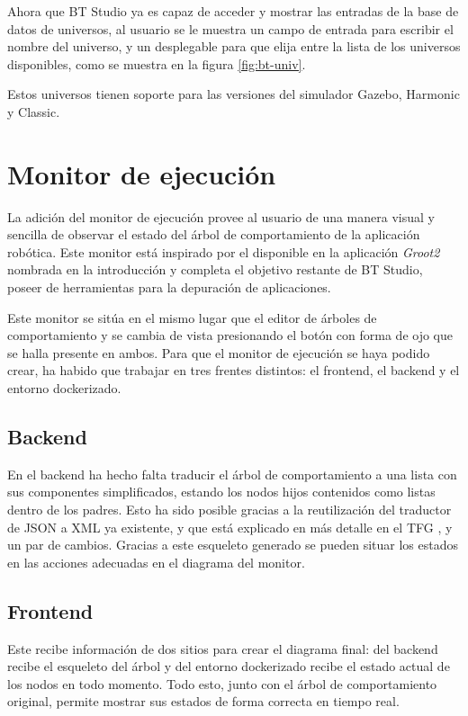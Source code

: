 Ahora que BT Studio ya es capaz de acceder y mostrar las entradas de la base de datos de universos, al usuario se le muestra un campo de entrada para escribir el nombre del universo, y un desplegable para que elija entre la lista de los universos disponibles, como se muestra en la figura \ref{fig:bt-univ}.

Estos universos tienen soporte para las versiones del simulador Gazebo, Harmonic y Classic.

\section{Monitor de ejecución}\label{sec:bt-monitor}

La adición del monitor de ejecución provee al usuario de una manera visual y sencilla de observar el estado del árbol de comportamiento de la aplicación robótica. Este monitor está inspirado por el disponible en la aplicación \textit{Groot2} nombrada en la introducción y completa el objetivo restante de BT Studio, poseer de herramientas para la depuración de aplicaciones.

Este monitor se sitúa en el mismo lugar que el editor de árboles de comportamiento y se cambia de vista presionando el botón con forma de ojo que se halla presente en ambos. Para que el monitor de ejecución se haya podido crear, ha habido que trabajar en tres frentes distintos: el frontend, el backend y el entorno dockerizado.

\subsection{Backend}

En el backend ha hecho falta traducir el árbol de comportamiento a una lista con sus componentes simplificados, estando los nodos hijos contenidos como listas dentro de los padres. Esto ha sido posible gracias a la reutilización del traductor de JSON a XML ya existente, y que está explicado en más detalle en el TFG \cite{TFG_BT_Studio}, y un par de cambios. Gracias a este esqueleto generado se pueden situar los estados en las acciones adecuadas en el diagrama del monitor.

\subsection{Frontend}

Este recibe información de dos sitios para crear el diagrama final: del backend recibe el esqueleto del árbol y del entorno dockerizado recibe el estado actual de los nodos en todo momento. Todo esto, junto con el árbol de comportamiento original, permite mostrar sus estados de forma correcta en tiempo real.

